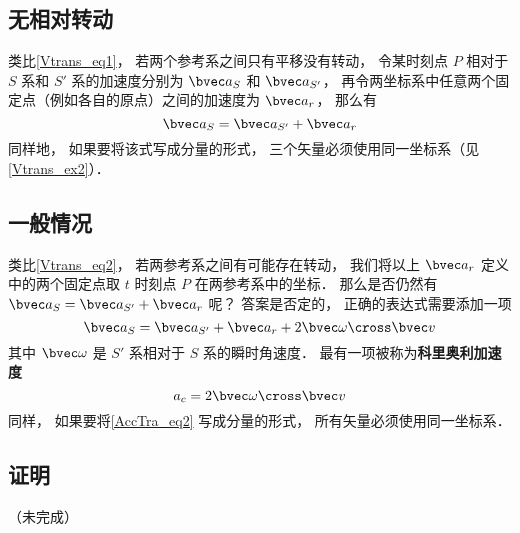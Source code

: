 

\subsection{无相对转动}
类比\autoref{Vtrans_eq1}， 若两个参考系之间只有平移没有转动， 令某时刻点 $P$ 相对于 $S$ 系和 $S'$ 系的加速度分别为 $\bvec a_S$ 和 $\bvec a_{S'}$， 再令两坐标系中任意两个固定点（例如各自的原点）之间的加速度为 $\bvec a_r$， 那么有
\begin{equation}\label{AccTra_eq1}
\bvec a_S = \bvec a_{S'} + \bvec a_r
\end{equation}
同样地， 如果要将该式写成分量的形式， 三个矢量必须使用同一坐标系（见\autoref{Vtrans_ex2}）．

\subsection{一般情况}
类比\autoref{Vtrans_eq2}， 若两参考系之间有可能存在转动， 我们将以上 $\bvec a_r$ 定义中的两个固定点取 $t$ 时刻点 $P$ 在两参考系中的坐标． 那么是否仍然有 $\bvec a_S = \bvec a_{S'} + \bvec a_r$ 呢？ 答案是否定的， 正确的表达式需要添加一项
\begin{equation}\label{AccTra_eq2}
\bvec a_S = \bvec a_{S'} + \bvec a_r + 2 \bvec \omega \cross \bvec v
\end{equation}
其中 $\bvec \omega$ 是 $S'$ 系相对于 $S$ 系的瞬时角速度． 最有一项被称为\textbf{科里奥利加速度}
\begin{equation}
a_c = 2 \bvec \omega \cross \bvec v
\end{equation}
同样， 如果要将\autoref{AccTra_eq2} 写成分量的形式， 所有矢量必须使用同一坐标系．

\subsection{证明}
（未完成）%
